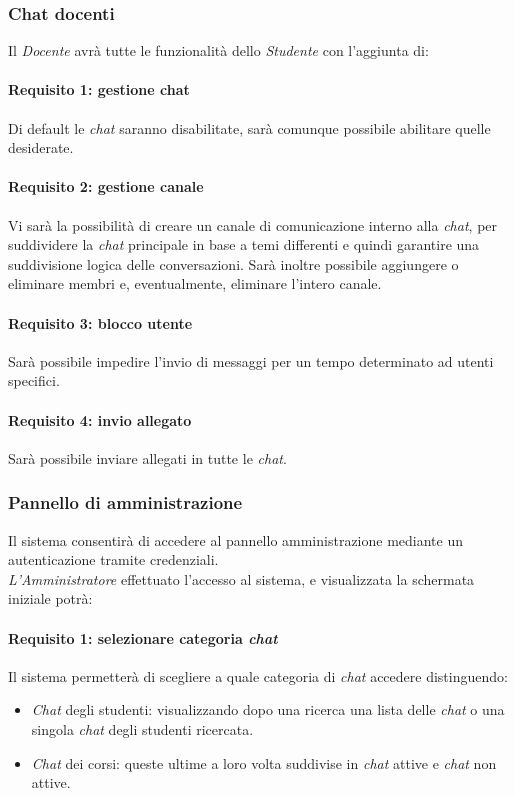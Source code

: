 \subsubsection{Chat docenti}
Il \emph{Docente} avrà tutte le funzionalità dello \emph{Studente} con l’aggiunta di:

\paragraph{Requisito 1: gestione chat\\}
Di default le \emph{chat} saranno disabilitate, sarà comunque possibile abilitare quelle desiderate.

\paragraph{Requisito 2: gestione canale\\}
Vi sarà la possibilità di creare un canale di comunicazione interno alla \emph{chat}, per suddividere la \emph{chat} principale in base a temi differenti e quindi garantire una suddivisione logica delle conversazioni. Sarà inoltre possibile aggiungere o eliminare membri e, eventualmente, eliminare l’intero canale.

\paragraph{Requisito 3: blocco utente\\}
Sarà possibile impedire l’invio di messaggi per un tempo determinato ad utenti specifici.

\paragraph{Requisito 4: invio allegato\\}
Sarà possibile inviare allegati in tutte le \emph{chat}.


\subsubsection{Pannello di amministrazione}
Il sistema consentirà di accedere al pannello amministrazione mediante un autenticazione tramite credenziali.\\
\emph{L’Amministratore} effettuato l’accesso al sistema, e visualizzata la schermata iniziale potrà:

\paragraph{Requisito 1: selezionare categoria \emph{chat}\\}
Il sistema permetterà di scegliere a quale categoria di \emph{chat} accedere distinguendo: 
\begin{itemize}
	\item \emph{Chat} degli studenti: visualizzando dopo una ricerca una lista delle \emph{chat} o una singola \emph{chat} degli studenti ricercata.
	\item \emph{Chat} dei corsi: queste ultime a loro volta suddivise in \emph{chat} attive e \emph{chat} non attive.
\end{itemize}

